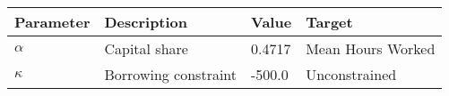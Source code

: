 \begin{tabular}{l l l l} 
\hline 
Parameter & Description & Value & Target \\ 
\hline 
$\alpha$ & Capital share & 0.4717 & Mean Hours Worked \\ 
$\kappa$ & Borrowing constraint & -500.0 & Unconstrained \\ 
\hline 
\end{tabular}